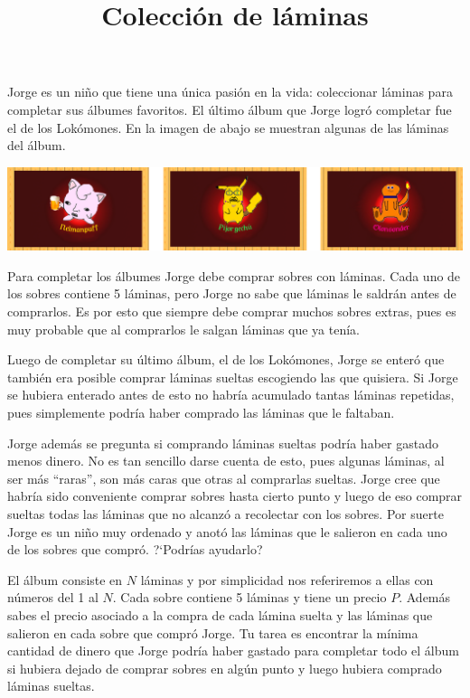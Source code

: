 \documentclass{oci}
\title{Colección de láminas}
\begin{document}
\begin{problemDescription}
Jorge es un niño que tiene una única pasión en la vida: coleccionar láminas para completar sus álbumes favoritos.
El último álbum que Jorge logró completar fue el de los Lokómones.
En la imagen de abajo se muestran algunas de las láminas del álbum.

\begin{center}
\includegraphics[scale=0.5]{locomons-laminas.png}
\end{center}

Para completar los álbumes Jorge debe comprar sobres con láminas.
Cada uno de los sobres contiene 5 láminas, pero Jorge no sabe que láminas le saldrán antes de comprarlos.
Es por esto que siempre debe comprar muchos sobres extras, pues es muy probable que al comprarlos le salgan láminas que ya tenía.

Luego de completar su último álbum, el de los Lokómones, Jorge se enteró que también era posible comprar láminas sueltas escogiendo las que quisiera.
Si Jorge se hubiera enterado antes de esto no habría acumulado tantas láminas repetidas, pues simplemente podría haber comprado las láminas que le faltaban.

Jorge además se pregunta si comprando láminas sueltas podría haber gastado menos dinero.
No es tan sencillo darse cuenta de esto, pues algunas láminas, al ser más ``raras'', son más caras que otras al comprarlas sueltas.
Jorge cree que habría sido conveniente comprar sobres hasta cierto punto y luego de eso comprar sueltas todas las láminas que no alcanzó a recolectar con los sobres.
Por suerte Jorge es un niño muy ordenado y anotó las láminas que le salieron en cada uno de los sobres que compró. ?`Podrías ayudarlo?

El álbum consiste en $N$ láminas y por simplicidad nos referiremos a ellas con números del 1 al $N$.
Cada sobre contiene 5 láminas y tiene un precio $P$.
Además sabes el precio asociado a la compra de cada lámina suelta y las láminas que salieron en cada sobre que compró Jorge.
Tu tarea es encontrar la mínima cantidad de dinero que Jorge podría haber gastado para completar todo el álbum si hubiera dejado de comprar sobres en algún punto y luego hubiera comprado láminas sueltas.
\end{problemDescription}
\end{document}
